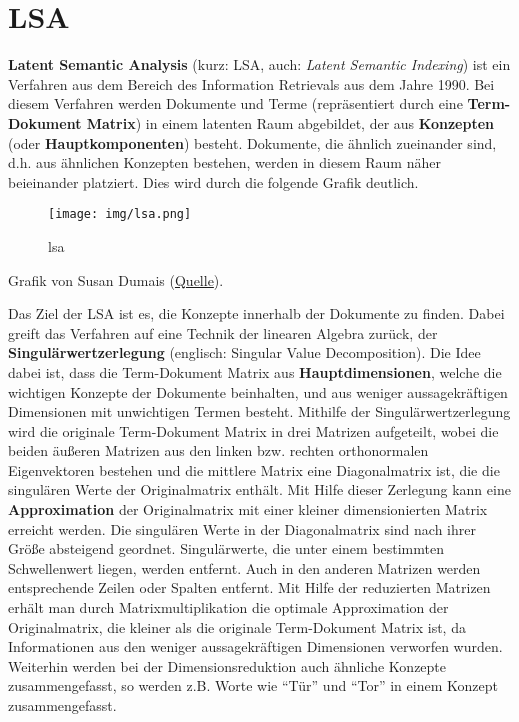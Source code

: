 \documentclass[11pt]{article}
\begin{document}
    \hypertarget{lsa}{%
\section{LSA}\label{lsa}}

\textbf{Latent Semantic Analysis} (kurz: LSA, auch: \emph{Latent
Semantic Indexing}) ist ein Verfahren aus dem Bereich des Information
Retrievals aus dem Jahre 1990. Bei diesem Verfahren werden Dokumente und
Terme (repräsentiert durch eine \textbf{Term-Dokument Matrix}) in einem
latenten Raum abgebildet, der aus \textbf{Konzepten} (oder
\textbf{Hauptkomponenten}) besteht. Dokumente, die ähnlich zueinander
sind, d.h. aus ähnlichen Konzepten bestehen, werden in diesem Raum näher
beieinander platziert. Dies wird durch die folgende Grafik deutlich.

\begin{figure}
\centering
\texttt{[image: img/lsa.png]}
\caption{lsa}
\end{figure}

Grafik von Susan Dumais
(\href{http://www.ifis.uni-luebeck.de/~moeller/tuhh-lectures/mmieir-sose-12/05-Latent-Semantic-Analysis.pdf}{Quelle}).

    Das Ziel der LSA ist es, die Konzepte innerhalb der Dokumente zu finden.
Dabei greift das Verfahren auf eine Technik der linearen Algebra zurück,
der \textbf{Singulärwertzerlegung} (englisch: Singular Value
Decomposition). Die Idee dabei ist, dass die Term-Dokument Matrix aus
\textbf{Hauptdimensionen}, welche die wichtigen Konzepte der Dokumente
beinhalten, und aus weniger aussagekräftigen Dimensionen mit unwichtigen
Termen besteht. Mithilfe der Singulärwertzerlegung wird die originale
Term-Dokument Matrix in drei Matrizen aufgeteilt, wobei die beiden
äußeren Matrizen aus den linken bzw. rechten orthonormalen Eigenvektoren
bestehen und die mittlere Matrix eine Diagonalmatrix ist, die die
singulären Werte der Originalmatrix enthält. Mit Hilfe dieser Zerlegung
kann eine \textbf{Approximation} der Originalmatrix mit einer kleiner
dimensionierten Matrix erreicht werden. Die singulären Werte in der
Diagonalmatrix sind nach ihrer Größe absteigend geordnet. Singulärwerte,
die unter einem bestimmten Schwellenwert liegen, werden entfernt. Auch
in den anderen Matrizen werden entsprechende Zeilen oder Spalten
entfernt. Mit Hilfe der reduzierten Matrizen erhält man durch
Matrixmultiplikation die optimale Approximation der Originalmatrix, die
kleiner als die originale Term-Dokument Matrix ist, da Informationen aus
den weniger aussagekräftigen Dimensionen verworfen wurden. Weiterhin
werden bei der Dimensionsreduktion auch ähnliche Konzepte
zusammengefasst, so werden z.B. Worte wie ``Tür'' und ``Tor'' in einem
Konzept zusammengefasst.
\end{document}

